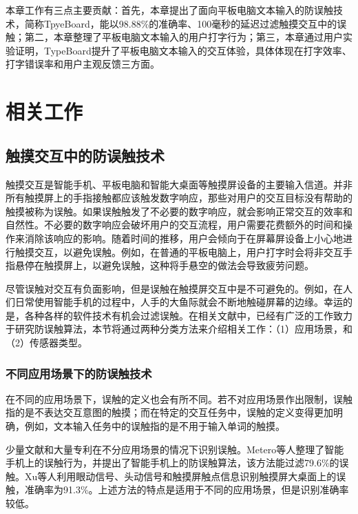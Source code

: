 本章工作有三点主要贡献：首先，本章提出了面向平板电脑文本输入的防误触技术，简称TpyeBoard，能以98.88\%的准确率、100毫秒的延迟过滤触摸交互中的误触；第二，本章整理了平板电脑文本输入的用户打字行为；第三，本章通过用户实验证明，TypeBoard提升了平板电脑文本输入的交互体验，具体体现在打字效率、打字错误率和用户主观反馈三方面。

\section{相关工作}

\subsection{触摸交互中的防误触技术}

触摸交互是智能手机、平板电脑和智能大桌面等触摸屏设备的主要输入信道。并非所有触摸屏上的手指接触都应该触发数字响应，那些对用户的交互目标没有帮助的触摸被称为误触\cite{2020-TabletopTouch, 2015-GestureOn, matero2012identifying}。如果误触触发了不必要的数字响应，就会影响正常交互的效率和自然性\cite{2014-PenMightier, 2020-TabletopTouch}。不必要的数字响应会破坏用户的交互流程，用户需要花费额外的时间和操作来消除该响应的影响。随着时间的推移，用户会倾向于在屏幕屏设备上小心地进行触摸交互，以避免误触。例如，在普通的平板电脑上，用户打字时会将非交互手指悬停在触摸屏上，以避免误触，这种将手悬空的做法会导致疲劳问题\cite{2018-UbiK}。

尽管误触对交互有负面影响，但是误触在触摸屏交互中是不可避免的。例如，在人们日常使用智能手机的过程中，人手的大鱼际就会不断地触碰屏幕的边缘\cite{2018-PalmTouch}。幸运的是，各种各样的软件技术有机会过滤误触。在相关文献中，已经有广泛的工作致力于研究防误触算法，本节将通过两种分类方法来介绍相关工作：（1）应用场景，和（2）传感器类型。

\subsubsection{不同应用场景下的防误触技术}

在不同的应用场景下，误触的定义也会有所不同。若不对应用场景作出限制，误触指的是不表达交互意图的触摸\cite{2020-TabletopTouch}；而在特定的交互任务中，误触的定义变得更加明确，例如，文本输入任务中的误触指的是不用于输入单词的触摸。

少量文献\cite{matero2012identifying, 2020-TabletopTouch}和大量专利\cite{2016-Classification,2006-PadUnint,2013-System,2013-Precluding,2015-TouchScreen}在不分应用场景的情况下识别误触。Metero等人整理了智能手机上的误触行为，并提出了智能手机上的防误触算法\cite{matero2012identifying}，该方法能过滤79.6\%的误触。Xu等人利用眼动信号、头动信号和触摸屏触点信息识别触摸屏大桌面上的误触，准确率为91.3\%。上述方法的特点是适用于不同的应用场景，但是识别准确率较低。

